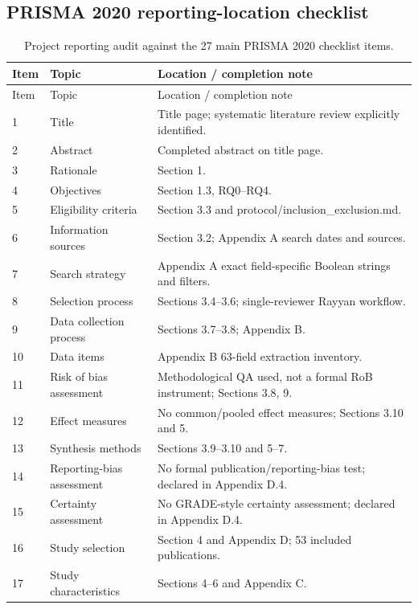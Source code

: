 \subsection{PRISMA 2020 reporting-location checklist}
\begingroup\footnotesize
\begin{longtable}{@{}p{}p{}p{}@{}}
\caption{Project reporting audit against the 27 main PRISMA 2020 checklist items.}\label{tab:app_prisma_checklist}\\
\toprule Item & Topic & Location / completion note \\\midrule\endfirsthead
\toprule Item & Topic & Location / completion note \\\midrule\endhead
1 & Title & Title page; systematic literature review explicitly identified.\\
2 & Abstract & Completed abstract on title page.\\
3 & Rationale & Section 1.\\
4 & Objectives & Section 1.3, RQ0--RQ4.\\
5 & Eligibility criteria & Section 3.3 and protocol/inclusion\_exclusion.md.\\
6 & Information sources & Section 3.2; Appendix A search dates and sources.\\
7 & Search strategy & Appendix A exact field-specific Boolean strings and filters.\\
8 & Selection process & Sections 3.4--3.6; single-reviewer Rayyan workflow.\\
9 & Data collection process & Sections 3.7--3.8; Appendix B.\\
10 & Data items & Appendix B 63-field extraction inventory.\\
11 & Risk of bias assessment & Methodological QA used, not a formal RoB instrument; Sections 3.8, 9.\\
12 & Effect measures & No common/pooled effect measures; Sections 3.10 and 5.\\
13 & Synthesis methods & Sections 3.9--3.10 and 5--7.\\
14 & Reporting-bias assessment & No formal publication/reporting-bias test; declared in Appendix D.4.\\
15 & Certainty assessment & No GRADE-style certainty assessment; declared in Appendix D.4.\\
16 & Study selection & Section 4 and Appendix D; 53 included publications.\\
17 & Study characteristics & Sections 4--6 and Appendix C.\\

\end{longtable}
